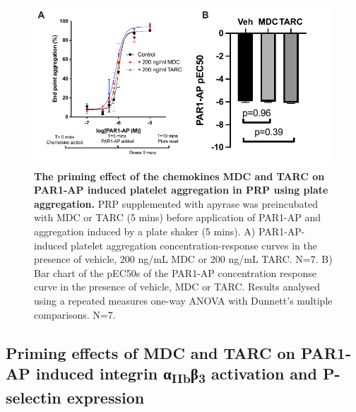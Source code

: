 \documentclass[11pt,twoside]{bristolthesis}
\begin{document}
\begin{figure}

{\centering \includegraphics{figure/Chemokines/Layouts/MDC_TARC_PRP_plate_agg} 

}

\caption[The priming effect of the chemokines MDC and TARC on PAR1-AP induced platelet aggregation in PRP using plate aggregation]{\textbf{The priming effect of the chemokines MDC and TARC on PAR1-AP induced platelet aggregation in PRP using plate aggregation.} PRP supplemented with apyrase was preincubated with MDC or TARC (5 mins) before application of PAR1-AP and aggregation induced by a plate shaker (5 mins). A) PAR1-AP-induced platelet aggregation concentration-response curves in the presence of vehicle, 200 ng/mL MDC or 200 ng/mL TARC. N=7. B) Bar chart of the pEC50s of the PAR1-AP concentration response curve in the presence of vehicle, MDC or TARC. Results analysed using a repeated measures one-way ANOVA with Dunnett's multiple comparisons. N=7.}\label{fig:MDC-TARC-agg-PRP}
\end{figure}
\hypertarget{priming-effects-of-mdc-and-tarc-on-par1-ap-induced-integrin-ux3b1iibux3b23-activation-and-p-selectin-expression}{%
\subsection{\texorpdfstring{Priming effects of MDC and TARC on PAR1-AP induced integrin α\textsubscript{IIb}β\textsubscript{3} activation and P-selectin expression}{Priming effects of MDC and TARC on PAR1-AP induced integrin αIIbβ3 activation and P-selectin expression}}\label{priming-effects-of-mdc-and-tarc-on-par1-ap-induced-integrin-ux3b1iibux3b23-activation-and-p-selectin-expression}}
\end{document}
